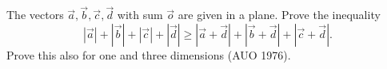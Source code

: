 The vectors $\vec a, \vec b, \vec c, \vec d$ with sum $\vec o$ are given in a plane. Prove the inequality
\[ |\vec a| + |\vec b| + |\vec c| + |\vec d| \geq |\vec a + \vec d| + |\vec b + \vec d| + |\vec c + \vec d|. \]
Prove this also for one and three dimensions (AUO 1976).
